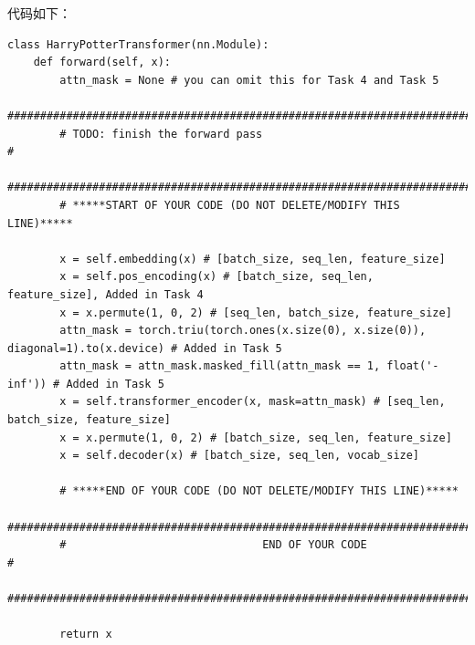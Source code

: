 \documentclass{article}%
\begin{document}
代码如下：
\begin{lstlisting}
class HarryPotterTransformer(nn.Module):
    def forward(self, x):        
        attn_mask = None # you can omit this for Task 4 and Task 5
        ################################################################################
        # TODO: finish the forward pass                                                #
        ################################################################################
        # *****START OF YOUR CODE (DO NOT DELETE/MODIFY THIS LINE)*****

        x = self.embedding(x) # [batch_size, seq_len, feature_size]
        x = self.pos_encoding(x) # [batch_size, seq_len, feature_size], Added in Task 4
        x = x.permute(1, 0, 2) # [seq_len, batch_size, feature_size]
        attn_mask = torch.triu(torch.ones(x.size(0), x.size(0)), diagonal=1).to(x.device) # Added in Task 5
        attn_mask = attn_mask.masked_fill(attn_mask == 1, float('-inf')) # Added in Task 5
        x = self.transformer_encoder(x, mask=attn_mask) # [seq_len, batch_size, feature_size]
        x = x.permute(1, 0, 2) # [batch_size, seq_len, feature_size]
        x = self.decoder(x) # [batch_size, seq_len, vocab_size]

        # *****END OF YOUR CODE (DO NOT DELETE/MODIFY THIS LINE)*****
        ################################################################################
        #                              END OF YOUR CODE                                #
        ################################################################################

        return x
\end{lstlisting}
\end{document}
